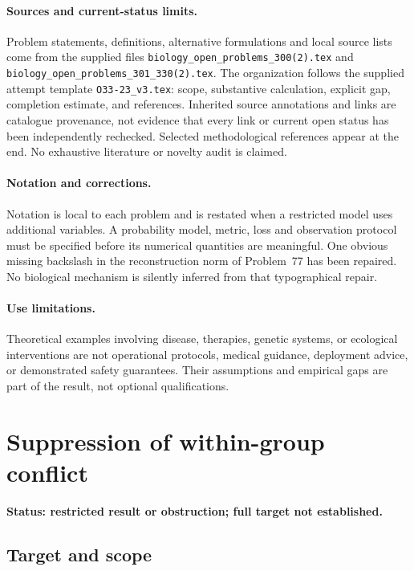 \documentclass[11pt]{article}
\begin{document}
\paragraph{Sources and current-status limits.}
Problem statements, definitions, alternative formulations and local source lists
come from the supplied files
\texttt{biology\_open\_problems\_300(2).tex} and
\texttt{biology\_open\_problems\_301\_330(2).tex}.
The organization follows the supplied attempt template
\texttt{O33-23\_v3.tex}: scope, substantive calculation, explicit gap,
completion estimate, and references. Inherited source annotations and links are
catalogue provenance, not evidence that every link or current open status has
been independently rechecked. Selected methodological references appear at the
end. No exhaustive literature or novelty audit is claimed.

\paragraph{Notation and corrections.}
Notation is local to each problem and is restated when a restricted model uses
additional variables. A probability model, metric, loss and observation protocol
must be specified before its numerical quantities are meaningful. One obvious
missing backslash in the reconstruction norm of Problem~77 has been repaired.
No biological mechanism is silently inferred from that typographical repair.

\paragraph{Use limitations.}
Theoretical examples involving disease, therapies, genetic systems, or ecological
interventions are not operational protocols, medical guidance, deployment advice,
or demonstrated safety guarantees. Their assumptions and empirical gaps are part
of the result, not optional qualifications.


\section*{Suppression of within-group conflict}
\label{prob:154}
\noindent\textbf{Status: restricted result or obstruction; full target not established.}
\subsection{Target and scope}
\end{document}

